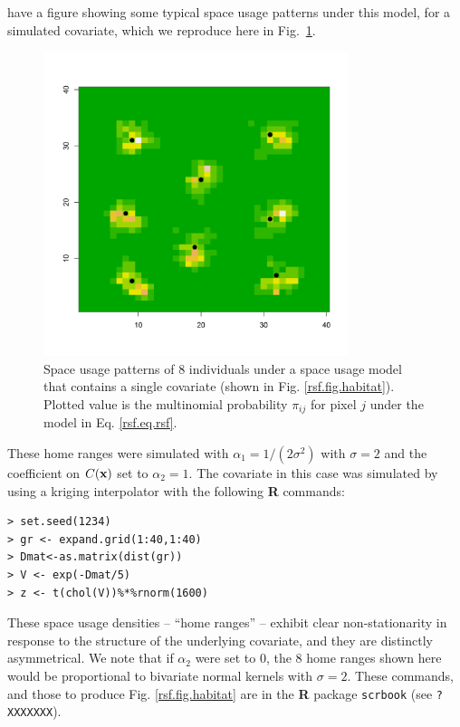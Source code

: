 \citet{royle_etal:2012mee} have a figure showing some typical space
usage patterns under this model, for a simulated covariate, which we
reproduce here in Fig.~\ref{rsf.fig.homeranges}. 
\begin{figure}[ht]
\centering
\includegraphics[width=3.5in,height=3.5in]{Ch13-RSF/figs/homeranges8}
\caption{Space usage patterns of 8 individuals under a space usage
  model that contains a single covariate (shown in
  Fig. \ref{rsf.fig.habitat}). Plotted value is the multinomial
  probability $\pi_{ij}$ for pixel $j$ under the model in Eq. \ref{rsf.eq.rsf}.
}
\label{rsf.fig.homeranges}
\end{figure}
These home ranges were simulated 
with $\alpha_{1} =
1/(2\sigma^2)$ with $\sigma = 2$ and the coefficient on $C({\bf x})$
set to $\alpha_{2} = 1$.
The covariate in this case was simulated by using a kriging
interpolator with the following {\bf R} commands:
\begin{verbatim}
> set.seed(1234)
> gr <- expand.grid(1:40,1:40)
> Dmat<-as.matrix(dist(gr))
> V <- exp(-Dmat/5)
> z <- t(chol(V))%*%rnorm(1600)
\end{verbatim}
These space usage densities -- ``home ranges'' -- exhibit clear
non-stationarity in response to the structure of the underlying
covariate, and they are distinctly asymmetrical.  We note that if
$\alpha_{2}$ were set to 0, the 8 home ranges shown here would
be proportional to bivariate normal kernels with $\sigma = 2$.
These commands, and those to produce Fig. \ref{rsf.fig.habitat} are in
the {\bf R} package \mbox{\tt scrbook} (see \mbox{\tt ?XXXXXXX}).
